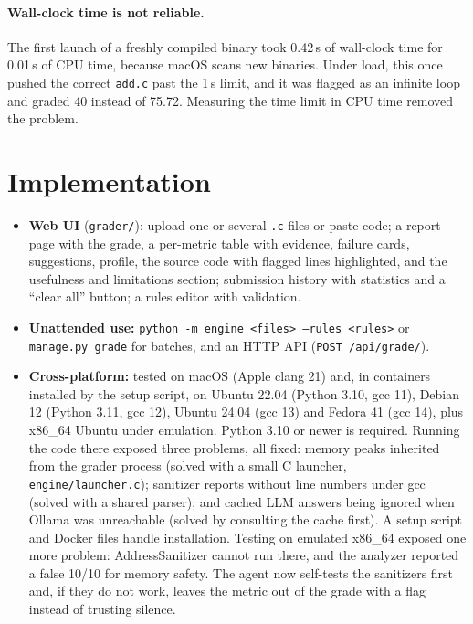 \documentclass[11pt,a4paper]{article}
\newcommand{\file}[1]{\nolinkurl{#1}}
\begin{document}
\paragraph{Wall-clock time is not reliable.} The first launch of a freshly compiled binary took 0.42\,s of wall-clock
time for 0.01\,s of CPU time, because macOS scans new binaries. Under load, this once pushed the correct \file{add.c}
past the 1\,s limit, and it was flagged as an infinite loop and graded 40 instead of 75.72. Measuring the time limit in
CPU time removed the problem.

\section{Implementation}
\begin{itemize}
  \item \textbf{Web UI} (\file{grader/}): upload one or several \texttt{.c} files or paste code; a report page with the
        grade, a per-metric table with evidence, failure cards, suggestions, profile, the source code with flagged lines
        highlighted, and the usefulness and limitations section; submission history with statistics and a ``clear all''
        button; a rules editor with validation.
  \item \textbf{Unattended use:} \texttt{python -m engine <files> --rules <rules>} or
        \texttt{manage.py grade} for batches, and an HTTP API (\texttt{POST /api/grade/}).
  \item \textbf{Cross-platform:} tested on macOS (Apple clang 21) and, in containers installed by the setup script, on
        Ubuntu 22.04 (Python 3.10, gcc 11), Debian 12 (Python 3.11, gcc 12), Ubuntu 24.04 (gcc 13) and Fedora 41 (gcc 14),
        plus x86\_64 Ubuntu under emulation. Python 3.10 or newer is required. Running the code there exposed three problems, all fixed: memory peaks inherited from the grader process (solved with a small C launcher, \file{engine/launcher.c}); sanitizer reports without line numbers under gcc (solved with a shared parser); and cached LLM answers being ignored when Ollama was unreachable (solved by consulting the cache first). A setup script and Docker files handle installation. Testing on emulated x86\_64 exposed one
        more problem: AddressSanitizer cannot run there, and the analyzer reported a false 10/10 for memory safety. The
        agent now self-tests the sanitizers first and, if they do not work, leaves the metric out of the grade with a flag
        instead of trusting silence.
\end{itemize}
\end{document}
